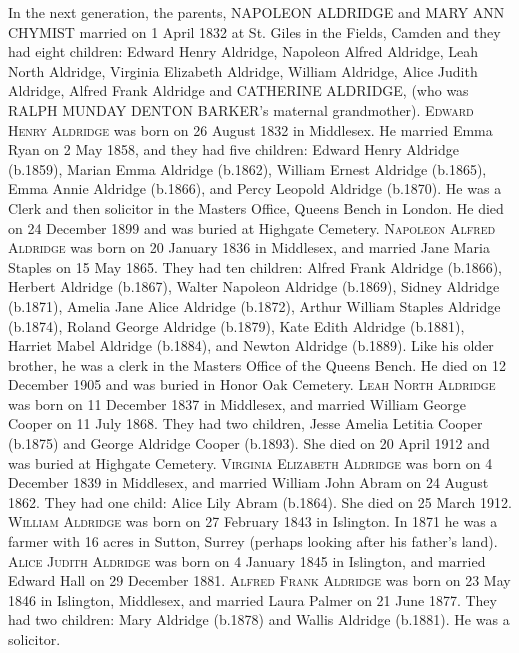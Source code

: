 In the next generation, the parents, \uppercase{Napoleon Aldridge} and \uppercase{Mary Ann Chymist} married on 1 April 1832 at St. Giles in the Fields, Camden and they had eight children: Edward Henry Aldridge, Napoleon Alfred Aldridge, Leah North Aldridge, Virginia Elizabeth Aldridge, William Aldridge, Alice Judith Aldridge, Alfred Frank Aldridge and \uppercase{Catherine Aldridge}, (who was \uppercase{Ralph Munday Denton Barker}'s maternal grandmother).
\textsc{Edward Henry Aldridge} was born on 26 August 1832 in Middlesex. He married Emma Ryan on 2 May 1858, and they had five children: Edward Henry Aldridge (b.1859), Marian Emma Aldridge (b.1862), William Ernest Aldridge (b.1865), Emma Annie Aldridge (b.1866), and Percy Leopold Aldridge (b.1870). He was a Clerk and then solicitor in the Masters Office, Queens Bench in London. He died on 24 December 1899 and was buried at Highgate Cemetery.
\textsc{Napoleon Alfred Aldridge} was born on 20 January 1836 in Middlesex, and married Jane Maria Staples on 15 May 1865. They had ten children: Alfred Frank Aldridge (b.1866), Herbert Aldridge (b.1867), Walter Napoleon Aldridge (b.1869), Sidney Aldridge (b.1871), Amelia Jane Alice Aldridge (b.1872), Arthur William Staples Aldridge (b.1874), Roland George Aldridge (b.1879), Kate Edith Aldridge (b.1881), Harriet Mabel Aldridge (b.1884), and Newton Aldridge (b.1889).  Like his older brother, he was a clerk in the Masters Office of the Queens Bench. He died on 12 December 1905 and was buried in Honor Oak Cemetery.
\textsc{Leah North Aldridge} was born on 11 December 1837 in Middlesex, and married William George Cooper on 11 July 1868. They had two children, Jesse Amelia Letitia Cooper (b.1875) and George Aldridge Cooper (b.1893). She died on	20 April 1912 and was buried at Highgate Cemetery.
\textsc{Virginia Elizabeth Aldridge} was born on 4 December 1839 in	Middlesex, and married William John Abram on 24 August 1862. They had one child: Alice Lily Abram (b.1864). She died on 25 March 1912.
\textsc{William Aldridge} was born on 27 February 1843 in	Islington. In 1871 he was a farmer with 16 acres in	Sutton, Surrey (perhaps looking after his father's land).
\textsc{Alice Judith Aldridge} was born on 4 January 1845 in	Islington, and married Edward Hall on 29 December 1881.  
\textsc{Alfred Frank Aldridge} was born on 23 May 1846 in Islington, Middlesex, and married Laura Palmer on 21 June 1877. They had two children:  Mary Aldridge (b.1878) and Wallis Aldridge (b.1881). He was a solicitor.




